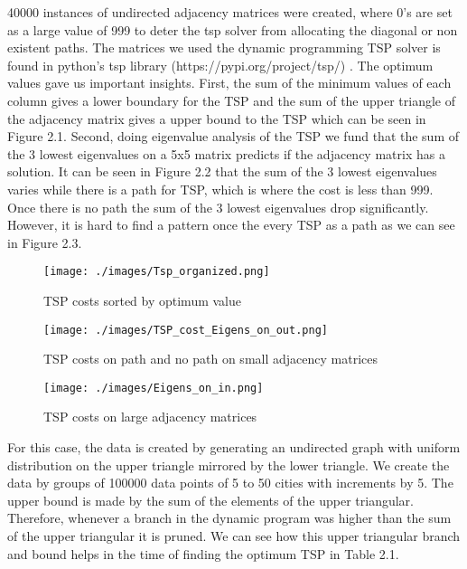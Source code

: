 \documentclass{iitthesis}
\begin{document}
40000 instances of undirected adjacency matrices were created, where 0's are set as a large value of 999 to deter the tsp solver from allocating the diagonal or non existent paths. The matrices we used the  dynamic programming TSP solver is found in python's tsp library (https://pypi.org/project/tsp/) . The optimum values gave us important insights. First, the sum of the minimum values of each column gives a lower boundary for the TSP and the sum of the upper triangle of the adjacency matrix gives a upper bound to the TSP which can be seen in Figure 2.1. Second, doing eigenvalue analysis of the TSP we fund that the sum of the 3 lowest eigenvalues on a 5x5 matrix predicts if the adjacency matrix has a solution. It can be seen in Figure 2.2 that the sum of the 3 lowest eigenvalues varies while there is a path for TSP, which is where the cost is less than 999. Once there is no path the sum of the 3 lowest eigenvalues drop significantly. However, it is hard to find a pattern once the every TSP as a path as we can see in Figure 2.3.

 
\begin{figure}   
    \centering
    \texttt{[image: ./images/Tsp\_organized.png]}
    \caption{TSP costs sorted by optimum value}
    \label{fig:trend3}
\end{figure}

\begin{figure}
    \centering
    \texttt{[image: ./images/TSP\_cost\_Eigens\_on\_out.png]}
    \caption{ 
TSP costs on path and no path on small adjacency matrices}
    \label{fig:trend3}
\end{figure}

\begin{figure}
    \centering
    \texttt{[image: ./images/Eigens\_on\_in.png]}
    \caption{
TSP costs on large adjacency matrices}
    \label{fig:trend3}
\end{figure}


For this case, the data is created by generating an undirected graph with uniform distribution on the upper triangle mirrored by the lower triangle. We create the data by groups of 100000 data points of 5 to 50 cities with increments by 5. The upper bound is made by the sum of the elements of the upper triangular. Therefore, whenever a branch in the dynamic program was higher than the sum of the upper triangular it is pruned. We can see how this upper triangular branch and bound helps in the time of finding the optimum TSP in Table 2.1.
\end{document}

